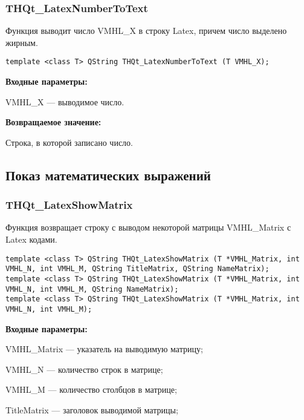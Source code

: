 \documentclass[a4paper,12pt]{article}
\begin{document}
\subsubsection{THQt\_LatexNumberToText}\label{THQt_LatexNumberToText}

Функция выводит число VMHL\_X в строку Latex, причем число выделено жирным.


\begin{lstlisting}[label=code_syntax_THQt_LatexNumberToText,caption=Синтаксис]
template <class T> QString THQt_LatexNumberToText (T VMHL_X);
\end{lstlisting}

\textbf{Входные параметры:}

VMHL\_X --- выводимое число.

\textbf{Возвращаемое значение:}

Строка, в которой записано число.


\subsection{Показ математических выражений}

\subsubsection{THQt\_LatexShowMatrix}\label{THQt_LatexShowMatrix}

Функция возвращает строку с выводом некоторой матрицы VMHL\_Matrix с Latex кодами.


\begin{lstlisting}[label=code_syntax_THQt_LatexShowMatrix,caption=Синтаксис]
template <class T> QString THQt_LatexShowMatrix (T *VMHL_Matrix, int VMHL_N, int VMHL_M, QString TitleMatrix, QString NameMatrix);
template <class T> QString THQt_LatexShowMatrix (T *VMHL_Matrix, int VMHL_N, int VMHL_M, QString NameMatrix);
template <class T> QString THQt_LatexShowMatrix (T *VMHL_Matrix, int VMHL_N, int VMHL_M);

\end{lstlisting}

\textbf{Входные параметры:}
 

VMHL\_Matrix --- указатель на выводимую матрицу;
 
    VMHL\_N --- количество строк в матрице;
 
    VMHL\_M --- количество столбцов в матрице;
 
    TitleMatrix --- заголовок выводимой матрицы;
 
\end{document}
